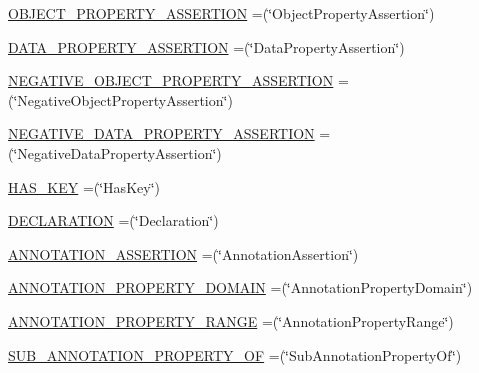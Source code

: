 \begin{DoxyCompactItemize}
\item 
\hyperlink{enumorg_1_1semanticweb_1_1owlapi_1_1vocab_1_1_o_w_l_x_m_l_vocabulary_ae1dde3a0773f8f09c4f67ea22c65b602}{O\-B\-J\-E\-C\-T\-\_\-\-P\-R\-O\-P\-E\-R\-T\-Y\-\_\-\-A\-S\-S\-E\-R\-T\-I\-O\-N} =(\char`\"{}Object\-Property\-Assertion\char`\"{})
\item 
\hyperlink{enumorg_1_1semanticweb_1_1owlapi_1_1vocab_1_1_o_w_l_x_m_l_vocabulary_a3bbb7c32c3b66f8b097f941ce3e9231d}{D\-A\-T\-A\-\_\-\-P\-R\-O\-P\-E\-R\-T\-Y\-\_\-\-A\-S\-S\-E\-R\-T\-I\-O\-N} =(\char`\"{}Data\-Property\-Assertion\char`\"{})
\item 
\hyperlink{enumorg_1_1semanticweb_1_1owlapi_1_1vocab_1_1_o_w_l_x_m_l_vocabulary_a6000f3a587cb3ca89f2c9a2a5ce11115}{N\-E\-G\-A\-T\-I\-V\-E\-\_\-\-O\-B\-J\-E\-C\-T\-\_\-\-P\-R\-O\-P\-E\-R\-T\-Y\-\_\-\-A\-S\-S\-E\-R\-T\-I\-O\-N} =(\char`\"{}Negative\-Object\-Property\-Assertion\char`\"{})
\item 
\hyperlink{enumorg_1_1semanticweb_1_1owlapi_1_1vocab_1_1_o_w_l_x_m_l_vocabulary_ae115e900367683748a979dabd8806cae}{N\-E\-G\-A\-T\-I\-V\-E\-\_\-\-D\-A\-T\-A\-\_\-\-P\-R\-O\-P\-E\-R\-T\-Y\-\_\-\-A\-S\-S\-E\-R\-T\-I\-O\-N} =(\char`\"{}Negative\-Data\-Property\-Assertion\char`\"{})
\item 
\hyperlink{enumorg_1_1semanticweb_1_1owlapi_1_1vocab_1_1_o_w_l_x_m_l_vocabulary_a751b12ee6edea38ca184e0f73357f965}{H\-A\-S\-\_\-\-K\-E\-Y} =(\char`\"{}Has\-Key\char`\"{})
\item 
\hyperlink{enumorg_1_1semanticweb_1_1owlapi_1_1vocab_1_1_o_w_l_x_m_l_vocabulary_a228f442da4ff7158c947d59165d211af}{D\-E\-C\-L\-A\-R\-A\-T\-I\-O\-N} =(\char`\"{}Declaration\char`\"{})
\item 
\hyperlink{enumorg_1_1semanticweb_1_1owlapi_1_1vocab_1_1_o_w_l_x_m_l_vocabulary_a7ea7317f8fc236af0dc5496a5ef90aa2}{A\-N\-N\-O\-T\-A\-T\-I\-O\-N\-\_\-\-A\-S\-S\-E\-R\-T\-I\-O\-N} =(\char`\"{}Annotation\-Assertion\char`\"{})
\item 
\hyperlink{enumorg_1_1semanticweb_1_1owlapi_1_1vocab_1_1_o_w_l_x_m_l_vocabulary_a94daecbf5d068117971527f24c2593ea}{A\-N\-N\-O\-T\-A\-T\-I\-O\-N\-\_\-\-P\-R\-O\-P\-E\-R\-T\-Y\-\_\-\-D\-O\-M\-A\-I\-N} =(\char`\"{}Annotation\-Property\-Domain\char`\"{})
\item 
\hyperlink{enumorg_1_1semanticweb_1_1owlapi_1_1vocab_1_1_o_w_l_x_m_l_vocabulary_a5e5ad650a4350399750437c103a7d071}{A\-N\-N\-O\-T\-A\-T\-I\-O\-N\-\_\-\-P\-R\-O\-P\-E\-R\-T\-Y\-\_\-\-R\-A\-N\-G\-E} =(\char`\"{}Annotation\-Property\-Range\char`\"{})
\item 
\hyperlink{enumorg_1_1semanticweb_1_1owlapi_1_1vocab_1_1_o_w_l_x_m_l_vocabulary_a1f5be453b5882c6eca73bce948d8d92b}{S\-U\-B\-\_\-\-A\-N\-N\-O\-T\-A\-T\-I\-O\-N\-\_\-\-P\-R\-O\-P\-E\-R\-T\-Y\-\_\-\-O\-F} =(\char`\"{}Sub\-Annotation\-Property\-Of\char`\"{})

\end{DoxyCompactItemize}
